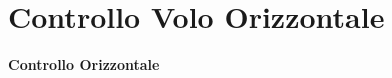 \documentclass[aspectratio=169]{beamer} %
\begin{document}


\section{Controllo Volo Orizzontale}

\begin{frame}
    \vfill
    \centering
    {\Huge \textbf{Controllo Orizzontale}}
    \vfill
\end{frame}
\end{document}
